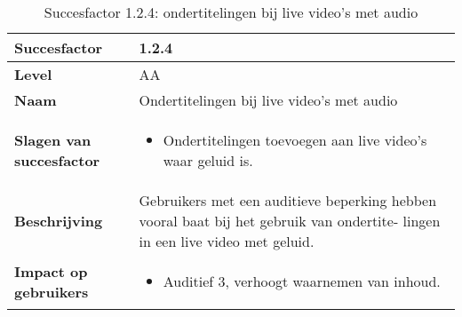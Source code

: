 \begin{table}[H]
    \centering
       \caption{Succesfactor 1.2.4: ondertitelingen bij live video’s met audio}
    \hspace*{-1cm}\begin{tabular}{|l|p{12cm}|} 
        \hline
        \textbf{Succesfactor}                & 1.2.4                                                                                                                                                                                                                                                                                                             \\ 
        \hline
        \textbf{Level}                       & AA                                                                                                                                                                                                                                                                                                                                                                             \\ 
        \hline
        \textbf{Naam}                        & Ondertitelingen bij live video’s met audio~                                                                                                                                                                                                                                                                                                                                                            \\ 
        \hline
        \textbf{Slagen van succesfactor}     & \begin{itemize}
            \item Ondertitelingen toevoegen aan live video’s waar geluid is.
        \end{itemize}                                                                                                                                                                                                      \\ 
        \hline
        \textbf{Beschrijving}                & Gebruikers met een auditieve beperking hebben vooral baat bij het gebruik van ondertite- lingen in een live video met geluid.  \\ 
        \hline
        \textbf{Impact op gebruikers}        & 
        \begin{itemize}
            \item Auditief 3, verhoogt waarnemen van inhoud.             

\end{itemize}
\end{tabular}
\end{table}
